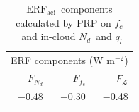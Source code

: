 \documentclass[acp, manuscript]{copernicus}\usepackage[]{graphicx}\usepackage[]{color}
\newcommand\nd{\ensuremath{N_d}}
\newcommand\cdnc{\nd}
\newcommand\lwp{\ensuremath{\mathcal L}}
\newcommand\fc{\ensuremath{f_c}}
\newcommand\cf{\fc}
\newcommand\ql{\ensuremath{q_l}}
\newcommand\erfaci{\ensuremath{\text{ERF}_\text{aci}}}
\begin{document}
\clearpage

\begin{table}[t]
  \caption{\erfaci\ components calculated by PRP on \fc\ and in-cloud \nd\ and
    \ql}
  \label{tab:in-cloud}
  \centering
  \begin{tabular}{rrr}
  \hline\hline
    \multicolumn{3}{c}{ERF components (W m$^{-2}$)}\\
$F_{\cdnc}$ & $F_{\cf}$ & $F_{\lwp}$ \\ 
  \hline
$-$0.48 & $-$0.30 & $-$0.48 \\ 
   \hline
\hline

  \end{tabular}
\end{table}


%
%
%
%
%
%
%
%
%
%
\end{document}
